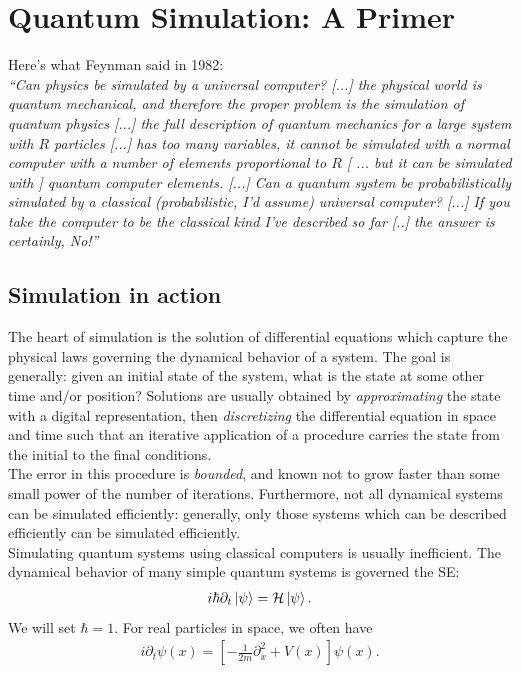 \documentclass{book}
\theoremstyle{definition}
\newcommand{\p}{\partial}
\newcommand{\had}{\mathcal{H}}
\newcommand{\f}[2]{\frac{#1}{#2}}
\newcommand{\lb}{\left[}
\newcommand{\rb}{\right]}
\begin{document}
\newpage






\section{Quantum Simulation: A Primer}

Here's what Feynman said in 1982:\\

\textit{``Can physics be simulated by a universal computer? [...] the physical world is quantum mechanical, and therefore the proper problem is the simulation of quantum physics [...] the full description of quantum mechanics for a large system with $R$ particles [...] has too many variables, it cannot be simulated
with a normal computer with a number of elements proportional to $R$ [ ... but it can be simulated with ] quantum computer elements. [...] Can a quantum system be probabilistically simulated by a classical (probabilistic, I'd assume) universal computer? [...] If you take the computer to be the classical kind I've described so far [..] the answer is certainly, No!''}


\subsection{Simulation in action}

The heart of simulation is the solution of differential equations which capture the physical
laws governing the dynamical behavior of a system. The goal is generally: given an initial state of the system, what is the state at some other time and/or position? Solutions are usually obtained by \textit{approximating} the state with a digital representation, then \textit{discretizing} the differential
equation in space and time such that an iterative application of a procedure carries the state from the initial to the final conditions.\\

The error in this procedure is \textit{bounded}, and known not to grow faster than some small power of the number of iterations. Furthermore, not all dynamical systems can be simulated efficiently: generally, only those systems which can be described efficiently can be simulated efficiently.\\

Simulating quantum systems using classical computers is usually inefficient. The dynamical behavior of many simple quantum systems is governed the SE:
\begin{align}
i\hbar \p_t \ket{\psi} = \had \ket{\psi}.
\end{align}
We will set $\hbar =1$.  For real particles in space, we often have
\begin{align}
i\p_t \psi(x) = \lb -\f{1}{2m}\p_x^2 + V(x) \rb \psi(x).
\end{align}
\end{document}
